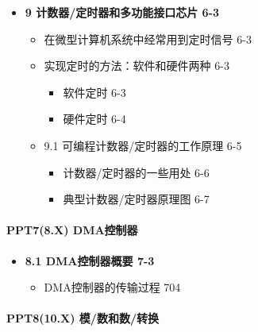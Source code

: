 \documentclass[zihao=5,linespread=1,heading=false,autoindent=0pt]{ctexart}
\newenvironment{citemize}%
{\begin{itemize}[parsep=0pt,itemsep=0pt,topsep=0pt,partopsep=0pt,labelwidth=1em,leftmargin=*]}
{\end{itemize}}
\theoremstyle{exampstyle} \newtheorem{definition}{定义}[section]
\theoremstyle{exampstyle} \newtheorem{example}{例}[section]
\theoremstyle{exampstyle} \newtheorem{theorem}{定理}[section]
\theoremstyle{exampstyle} \newtheorem{lemma}{引理}[section]
\theoremstyle{exampstyle} \newtheorem{myproof}{证明}[section]
\begin{document}
\begin{multicols*}{3}
    \begin{citemize}
     
    \item
      \textbf{9 计数器/定时器和多功能接口芯片 6-3}
    
      \begin{citemize}
       
      \item
        在微型计算机系统中经常用到定时信号 6-3
      \item
        实现定时的方法：软件和硬件两种 6-3
    
        \begin{citemize}
         
        \item
          软件定时 6-3
        \item
          硬件定时 6-4
        \end{citemize}
      \item
        9.1 可编程计数器/定时器的工作原理 6-5
    
        \begin{citemize}
         
        \item
          计数器/定时器的一些用处 6-6
        \item
          典型计数器/定时器原理图 6-7
        \end{citemize}
      \end{citemize}
    \end{citemize}
    
    \hypertarget{ppt78.x-dmaux63a7ux5236ux5668}{%
    \paragraph{PPT7(8.X) DMA控制器}\label{ppt78.x-dmaux63a7ux5236ux5668}}
    
    \begin{citemize}
     
    \item
      \textbf{8.1 DMA控制器概要 7-3}
    
      \begin{citemize}
       
      \item
        DMA控制器的传输过程 704
      \end{citemize}
    \end{citemize}
    
    \hypertarget{ppt810.x-ux6a21ux6570ux548cux6570ux8f6cux6362}{%
    \paragraph{PPT8(10.X)
    模/数和数/转换}\label{ppt810.x-ux6a21ux6570ux548cux6570ux8f6cux6362}}
    

\end{multicols*}
\end{document}
